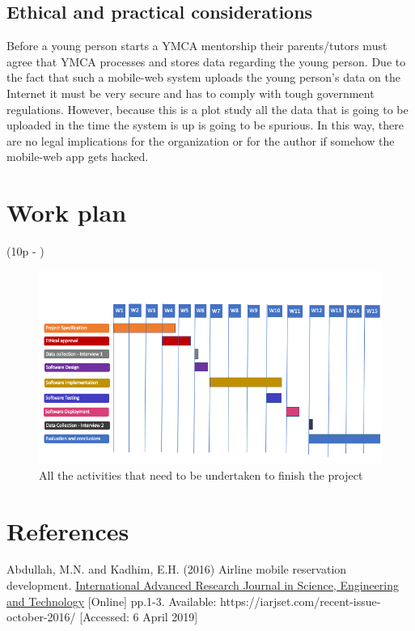 \documentclass[version=last,fontsize=13pt]{scrartcl}
\begin{document}
\subsection{Ethical and practical considerations}
	Before a young person starts a YMCA mentorship their parents/tutors must agree that YMCA processes and stores data regarding the young person. Due to the fact that such a mobile-web system uploads the young person's data on the Internet it must be very secure and has to comply with tough government regulations. However, because this is a plot study all the data that is going to be uploaded in the time the system is up is going to be spurious. In this way, there are no legal implications for the organization or for the author if somehow the mobile-web app gets hacked. 

\pagebreak
\section{Work plan}(10p - )\\
\blindtext

	\begin{figure}[H]

		\includegraphics[scale = 0.5]{./imgs/ganttChart}
		\caption{All the activities that need to be undertaken to finish the project}
		\label{gC}

	\end{figure}

\pagebreak
\section*{References}
Abdullah, M.N. and Kadhim, E.H. (2016) Airline mobile reservation development.  \underline{International Advanced Research Journal in Science, Engineering and Technology} [Online]  pp.1-3. Available: https://iarjset.com/recent-issue-october-2016/ [Accessed: 6 April 2019]\\
\end{document}
